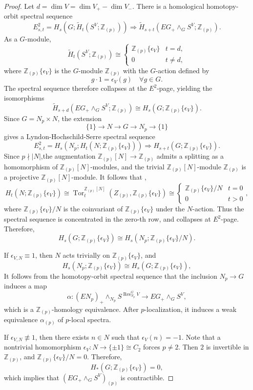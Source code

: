\documentclass{amsart}
\theoremstyle{plain}
\theoremstyle{definition}
\theoremstyle{remark}
\begin{document}
\begin{proof}
    Let $d=\dim V=\dim V_+-\dim V_-$. There is a homological homotopy-orbit spectral sequence \cite[Proposition B.7]{campbell2024hilbert}
    \[
    E_{s,t}^2=H_s(G;\tilde{H}_t(S^V;\mathbb Z_{(p)}))\Longrightarrow \tilde{H}_{s+t}(EG_+\wedge_G S^V;\mathbb Z_{(p)}).
    \]
    As a $G$-module,
    \[
    \tilde{H}_{t}(S^V;\mathbb Z_{(p)})\cong \begin{cases}
        \mathbb Z_{(p)}\{\epsilon_V\} & t=d,\\
        0 & t\neq d,
    \end{cases}
    \]
    where $\mathbb Z_{(p)}\{\epsilon_V\}$ is the $G$-module $\mathbb Z_{(p)}$ with the $G$-action defined by
    $$g\cdot 1 = \epsilon_V(g) \quad \forall g\in G.$$
    The spectral sequence therefore collapses at the $E^2$-page, yielding the isomorphisms
    \[
    \tilde{H}_{s+d}(EG_+\wedge_G S^V;\mathbb Z_{(p)})\cong H_s(G;\mathbb Z_{(p)}\{\epsilon_V\}).
    \]
    Since $G=N_p\times N$, the extension 
    \[
    \{1\}\to N \to G \to N_p \to \{1\}
    \] 
    gives a Lyndon-Hochschild-Serre spectral sequence
    \[
    E^2_{s,t}=H_s(N_p;H_t(N;\mathbb Z_{(p)}\{\epsilon_V\}))\Longrightarrow H_{s+t}(G;\mathbb Z_{(p)}\{\epsilon_V\}).
    \]
    Since $p\nmid |N|$,the augmentation $\mathbb Z_{(p)}[N]\to \mathbb Z_{(p)}$ admits a splitting as a homomorphism of $\mathbb Z_{(p)}[N]$-modules, and the trivial $\mathbb Z_{(p)}[N]$-module $\mathbb{Z}_{(p)}$ is a projective $\mathbb Z_{(p)}[N]$-module. It follows that , 
    \[
    H_t(N;\mathbb Z_{(p)}\{\epsilon_V\})\cong \operatorname{Tor}_t^{\mathbb Z_{(p)}[N]}(Z_{(p)},\mathbb Z_{(p)}\{\epsilon_V\})\cong\begin{cases}
        \mathbb Z_{(p)}\{\epsilon_{V}\}/N & t=0\\
        0 & t>0
    \end{cases},
    \]
    where $\mathbb Z_{(p)}\{\epsilon_V\}/N$ is the coinvariant of $\mathbb Z_{(p)}\{\epsilon_V\}$ under the $N$-action. 
    Thus the spectral sequence is concentrated in the zero-th row, and collapses at $E^2$-page. Therefore,
    \[
    H_s(G;\mathbb Z_{(p)}\{\epsilon_V\})\cong H_s(N_p;\mathbb Z_{(p)}\{\epsilon_V\}/N).
    \]

    If $\epsilon_{V,N}\equiv 1$, then $N$ acts trivially on $\mathbb Z_{(p)}\{\epsilon_V\}$, and 
    \[
    H_s(N_p;\mathbb Z_{(p)}\{\epsilon_V\})\cong H_s(G;\mathbb Z_{(p)}\{\epsilon_V\}),
    \]
    It follows from the homotopy-orbit spectral sequence that the inclusion $N_p\to G$ induces a map $$\alpha: (EN_p)_+\wedge_{N_p} S^{\operatorname{Res}_{N_p}^G V}\to EG_+\wedge_G S^V,$$ which is a $\mathbb Z_{(p)}$-homology equivalence. After $p$-localization, it induces a weak equivalence $\alpha_{(p)}$ of $p$-local spectra.
    
    If $\epsilon_{V,N}\not\equiv 1$, then there exists $n\in N$ such that $\epsilon_V(n)=-1$. Note that a nontrivial homomorphism $\epsilon_V: N \to \{\pm 1\}\cong C_2$ forces $p\neq 2$. Then $2$ is invertible in $\mathbb Z_{(p)}$, and $\mathbb Z_{(p)}\{\epsilon_V\}/N=0$. Therefore, $$H_\ast(G;\mathbb Z_{(p)}\{\epsilon_V\})=0,$$
    which implies that $(EG_+\wedge_G S^V)_{(p)}$ is contractible.
\end{proof}
    
\end{document}
